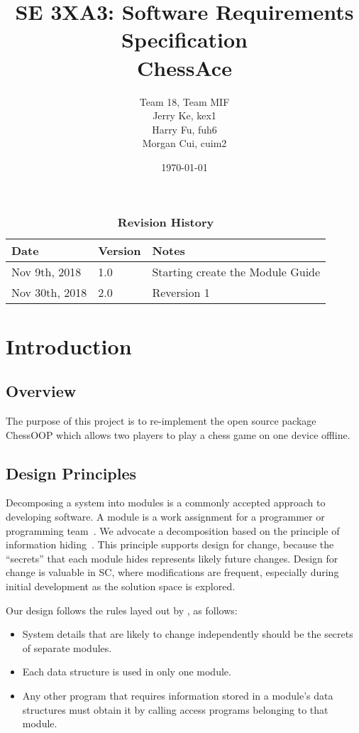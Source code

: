 \documentclass[12pt, titlepage]{article}
\title{SE 3XA3: Software Requirements Specification\\ChessAce}
\author{Team 18, Team MIF
		\\ Jerry Ke, kex1
		\\ Harry Fu, fuh6
		\\ Morgan Cui, cuim2
}
\date{\today}
\begin{document}
\maketitle

\tableofcontents
\listoftables
\listoffigures

\begin{table}[bp]
\caption{\bf Revision History}
\color{red}
\begin{tabularx}{\textwidth}{p{3cm}p{2cm}X}
\toprule {\bf Date} & {\bf Version} & {\bf Notes}\\
\midrule
Nov 9th, 2018 & 1.0 & Starting create the Module Guide \\
Nov 30th, 2018 & 2.0 & Reversion 1\\
\bottomrule
\end{tabularx}
\end{table}




\section{Introduction}

\subsection{Overview}
The purpose of this project is to re-implement the open source package ChessOOP which allows two players to play a chess game on one device offline.

\subsection{Design Principles}
Decomposing a system into modules is a commonly accepted approach to developing
software.  A module is a work assignment for a programmer or programming
team~\citep{ParnasEtAl1984}.  We advocate a decomposition
based on the principle of information hiding~\citep{Parnas1972a}.  This
principle supports design for change, because the ``secrets'' that each module
hides represents likely future changes.  Design for change is valuable in SC,
where modifications are frequent, especially during initial development as the
solution space is explored.  ~\citep{Bokahari2018}

Our design follows the rules layed out by \citet{ParnasEtAl1984}, as follows:
\begin{itemize}
\item System details that are likely to change independently should be the
  secrets of separate modules.
\item Each data structure is used in only one module.
\item Any other program that requires information stored in a module's data
  structures must obtain it by calling access programs belonging to that module.
\end{itemize}
\end{document}
